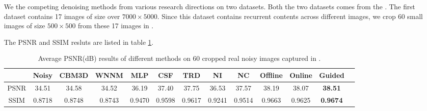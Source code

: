 \documentclass[10pt,twocolumn,letterpaper]{article}
\begin{document}
We  the competing denoising methods from various research directions on two datasets. Both the two datasets comes from the \cite{crosschannel2016}. The first dataset contains 17 images of size over $7000\times5000$. Since this dataset contains recurrent contents across different images, we crop 60 small images of size $500\times500$ from these 17 images in \cite{crosschannel2016}.

The PSNR and SSIM resluts are listed in table \ref{tab1}.
\begin{table}\label{tab1}
\caption{Average PSNR(dB) results of different methods on 60 cropped real noisy images captured in \cite{crosschannel2016}.}
\label{tab1}
\begin{center}
\renewcommand\arraystretch{1}
\begin{tabular}{|c||c|c|c|c|c|c|c|c|c|c|c|c|}
\hline
 & \textbf{Noisy} &\textbf{CBM3D}&\textbf{WNNM}&\textbf{MLP}&\textbf{CSF}&\textbf{TRD}& \textbf{NI}& \textbf{NC}&\textbf{Offline} &\textbf{Online} &\textbf{Guided} 
\\
\hline
PSNR & 34.51  &  34.58 &  34.52  & 36.19   & 37.40 & 37.75 &  36.53  &  37.57  &  38.19   & 38.07 &  \textbf{ 38.51}
\\
\hline
SSIM & 0.8718  & 0.8748  & 0.8743   & 0.9470 & 0.9598 &  0.9617 & 0.9241  &  0.9514  &  0.9663   & 0.9625 &   \textbf{0.9674}
\\
\hline
\end{tabular}
\end{center}
\end{table}
\end{document}
